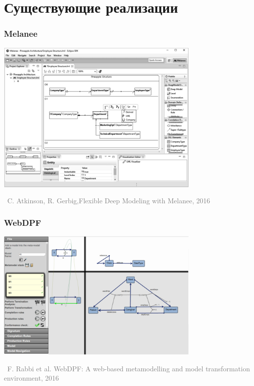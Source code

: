 \documentclass[xetex,mathserif,serif]{beamer}
\newcommand{\attribution}[1] {
\vspace{-5mm}\begin{flushright}\begin{scriptsize}\textcolor{gray}{\textcopyright\, #1}\end{scriptsize}\end{flushright}
}
\begin{document}
	\section{Существующие реализации}

	\begin{frame}
		\frametitle{Melanee}
		\begin{center}
			\includegraphics[width=0.75\textwidth]{melanee.png}
			\attribution{C. Atkinson, R. Gerbig,Flexible Deep Modeling with Melanee, 2016}
		\end{center}
	\end{frame}

	\begin{frame}
		\frametitle{WebDPF}
		\begin{center}
			\includegraphics[width=0.75\textwidth]{webDpf.png}
			\attribution{F. Rabbi et al. WebDPF: A web-based metamodelling and model transformation environment, 2016}
		\end{center}
	\end{frame}
\end{document}
